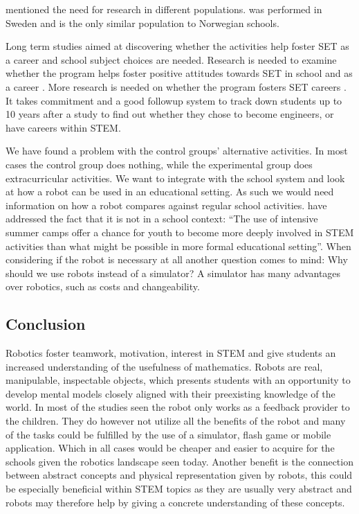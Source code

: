 \bigskip\noindent
{} mentioned the need for research in different populations.  was performed in Sweden and is the only similar population to Norwegian schools. %

\bigskip\noindent
Long term studies aimed at discovering whether the activities help foster SET as a career and school subject choices are needed. Research is needed to examine whether the program helps foster positive attitudes towards SET in school and as a career . More research is needed on whether the program fosters SET careers \cite{barker2007robotics}. It takes commitment and a good followup system to track down students up to 10 years after a study to find out whether they chose to become engineers, or have careers within STEM. %

\bigskip\noindent
We have found a problem with the control groups' alternative activities. In most cases the control group does nothing, while the experimental group does extracurricular activities. We want to integrate with the school system and look at how a robot can be used in an educational setting. As such we would need information on how a robot compares against regular school activities. 
 have addressed the fact that it is not in a school context: ``The use of intensive summer camps offer a chance for youth to become more deeply involved in STEM activities than what might be possible in more formal educational setting''. When considering if the robot is necessary at all another question comes to mind: Why should we use robots instead of a simulator? A simulator has many advantages over robotics, such as costs and changeability. %

\subsection*{Conclusion}\label{ch:literatureConclusion}
Robotics foster teamwork, motivation, interest in STEM and give students an increased understanding of the usefulness of mathematics. Robots are real, manipulable, inspectable objects, which presents students with an opportunity to develop mental models closely aligned with their preexisting knowledge of the world. In most of the studies seen the robot only works as a feedback provider to the children. They do however not utilize all the benefits of the robot and many of the tasks could be fulfilled by the use of a simulator, flash game or mobile application. Which in all cases would be cheaper and easier to acquire for the schools given the robotics landscape seen today. Another benefit is the connection between abstract concepts and physical representation given by robots, this could be especially beneficial within STEM topics as they are usually very abstract and robots may therefore help by giving a concrete understanding of these concepts.


